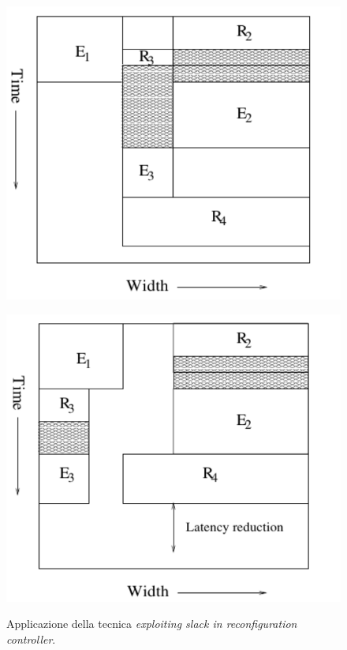 \begin{figure}[t]
\begin{minipage}[b]{0.4\textwidth}
 \begin{center}
\includegraphics[width=\linewidth]{capitoli/figure/cap3/SlackRecController1.pdf}
\label{fig:slackRecController1}
 \end{center}
\end{minipage}
\hfill
\begin{minipage}[b]{0.4\textwidth}
 \begin{center}
\includegraphics[width=\linewidth]{capitoli/figure/cap3/SlackRecController2.pdf}
\label{fig:slackRecController2}
 \end{center}
\end{minipage}
\caption[Applicazione della tecnica exploiting slack in reconfiguration 
controller]{Applicazione della tecnica \emph{exploiting slack in reconfiguration 
controller}.\footnotemark}
\label{fig:slackRecController}
\end{figure}


